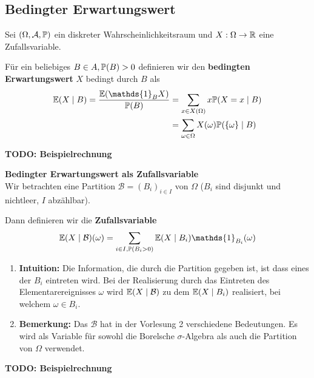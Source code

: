 \subsection{Bedingter Erwartungswert}
Sei $(\Omega, \A, \P)$ ein diskreter Wahrscheinlichkeitsraum und $X:\Omega \to \R$ eine Zufallsvariable. 

Für ein beliebiges $B \in A, \P(B) > 0$ definieren wir den \textbf{bedingten Erwartungswert} $X$ bedingt durch $B$ als
\begin{align*}
    \E(X \mid B) = \frac{\E(\mathds{1}_B X)}{\P(B)} &= \sum_{x \in X(\Omega)}x\P(X = x\mid B)\\ 
    &= \sum_{\omega \in \Omega}X(\omega)\P(\{\omega\}\mid B)
\end{align*}

\textbf{TODO: Beispielrechnung}


\textbf{Bedingter Erwartungswert als Zufallsvariable}\\
Wir betrachten eine Partition $\mathcal{B} = (B_i)_{i \in I}$ von $\Omega$ ($B_i$ sind disjunkt und nichtleer, $I$ abzählbar). 

Dann definieren wir die \textbf{Zufallsvariable}
$$\E(X \mid \mathcal{B})(\omega) = \sum_{i \in I, \P(B_i > 0)} \E(X \mid B_i) \mathds{1}_{B_i}(\omega)$$ 
\begin{enumerate}
    \item \textbf{Intuition:} Die Information, die durch die Partition gegeben ist, ist dass eines der $B_i$ eintreten wird. Bei der Realisierung durch das Eintreten des Elementarereignisses $\omega$ wird $\E(X \mid \mathcal{B})$ zu dem $\E(X \mid B_i)$ realisiert, bei welchem $\omega \in B_i$.
    \item \textbf{Bemerkung:} Das $\mathcal{B}$ hat in der Vorlesung 2 verschiedene Bedeutungen. Es wird als Variable für sowohl die Borelsche $\sigma$-Algebra als auch die Partition von $\Omega$ verwendet.
\end{enumerate}
\textbf{TODO: Beispielrechnung}

